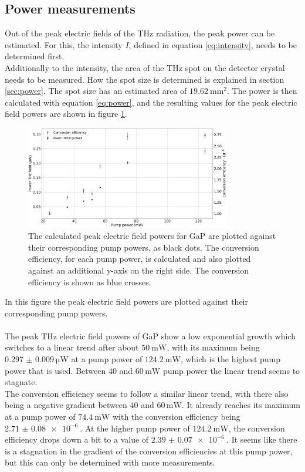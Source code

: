 \subsection{Power measurements}
Out of the peak electric fields of the $\si{\tera\hertz}$ radiation, the peak power can be estimated.
For this, the intensity $I$, defined in equation \ref{eq:intensity}, needs to be determined first.
\\
Additionally to the intensity, the area of the $\si{\tera\hertz}$ spot on the detector crystal needs to be measured.
How the spot size is determined is explained in section \ref{sec:power}.
The spot size has an estimated area of $\SI{19.62}{\milli\meter\squared}$.
The power is then calculated with equation \eqref{eq:power}, and the resulting values for the peak electric field powers are shown in figure \ref{fig:gap_power}.\FloatBarrier
\begin{figure}
    \centering
    \includegraphics[width=0.8\textwidth]{Plots/Powergap.pdf}
    \caption{The calculated peak electric field powers for GaP are plotted against their corresponding pump powers, as black dots.
    The conversion efficiency, for each pump power, is calculated and also plotted against an additional y-axis on the right side.
    The conversion efficiency is shown as blue crosses.}
    \label{fig:gap_power}\FloatBarrier
\end{figure}
In this figure the peak electric field powers are plotted against their corresponding pump powers.
\\\\
The peak $\si{\tera\hertz}$ electric field powers of GaP show a low exponential growth which switches to a linear trend after about $\SI{50}{\milli\W}$, with its maximum being $\SI{0.297(9)}{\micro\W}$ at a pump power of $\SI{124.2}{\milli\W}$, which is the highest pump power that is used.
Between $40$ and $60 \, \si{\milli\W}$ pump power the linear trend seems to stagnate.
\\
The conversion efficiency seems to follow a similar linear trend, with there also being a negative gradient between  $40$ and $60 \, \si{\milli\W}$.
It already reaches its maximum at a pump power of $\SI{74.4}{\milli\W}$ with the conversion efficiency being $\SI{2.71(8)e-6}{}$.
At the higher pump power of $\SI{124.2}{\milli\W}$, the conversion efficiency drops down a bit to a value of $\SI{2.39(7)e-6}{}$.
It seems like there is a stagnation in the gradient of the conversion efficiencies at this pump power, but this can only be determined with more measurements.
\FloatBarrier
